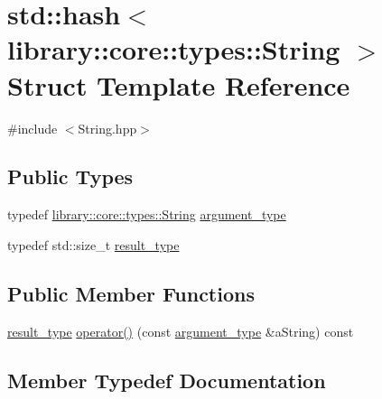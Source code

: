 \hypertarget{structstd_1_1hash_3_01library_1_1core_1_1types_1_1String_01_4}{}\section{std\+:\+:hash$<$ library\+:\+:core\+:\+:types\+:\+:String $>$ Struct Template Reference}
\label{structstd_1_1hash_3_01library_1_1core_1_1types_1_1String_01_4}


{\ttfamily \#include $<$String.\+hpp$>$}

\subsection*{Public Types}
\begin{DoxyCompactItemize}
\item 
typedef \hyperlink{classlibrary_1_1core_1_1types_1_1String}{library\+::core\+::types\+::\+String} \hyperlink{structstd_1_1hash_3_01library_1_1core_1_1types_1_1String_01_4_a02e9e2783fae71235bd5239d3b8cab75}{argument\+\_\+type}
\item 
typedef std\+::size\+\_\+t \hyperlink{structstd_1_1hash_3_01library_1_1core_1_1types_1_1String_01_4_a7c325dc55fee13f3b845ef9c8946a597}{result\+\_\+type}
\end{DoxyCompactItemize}
\subsection*{Public Member Functions}
\begin{DoxyCompactItemize}
\item 
\hyperlink{structstd_1_1hash_3_01library_1_1core_1_1types_1_1String_01_4_a7c325dc55fee13f3b845ef9c8946a597}{result\+\_\+type} \hyperlink{structstd_1_1hash_3_01library_1_1core_1_1types_1_1String_01_4_a71f1e3f818bf4b3f30bc3245bfd6843e}{operator()} (const \hyperlink{structstd_1_1hash_3_01library_1_1core_1_1types_1_1String_01_4_a02e9e2783fae71235bd5239d3b8cab75}{argument\+\_\+type} \&a\+String) const
\end{DoxyCompactItemize}


\subsection{Member Typedef Documentation}
\mbox{\label{structstd_1_1hash_3_01library_1_1core_1_1types_1_1String_01_4_a02e9e2783fae71235bd5239d3b8cab75}} 
